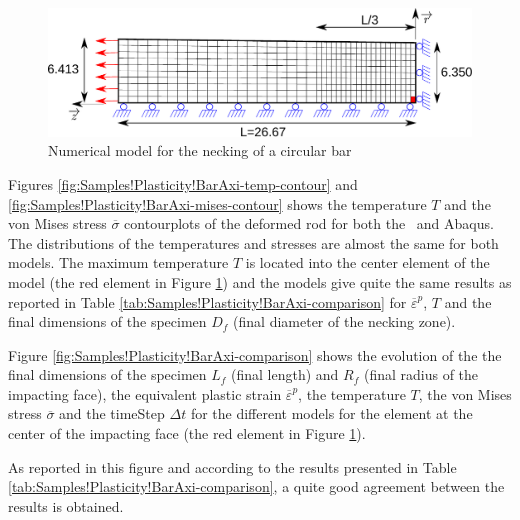 \begin{figure}[h]
\begin{centering}
\includegraphics[width=0.75\columnwidth]{Figures/BarNecking}
\par\end{centering}
\caption{Numerical model for the necking of a circular bar\label{fig:Samples!Plasticity!NeckingAxi}}
\end{figure}

Figures \ref{fig:Samples!Plasticity!BarAxi-temp-contour} and \ref{fig:Samples!Plasticity!BarAxi-mises-contour}
shows the temperature $T$ and the von Mises stress $\overline{\sigma}$
contourplots of the deformed rod for both the \DynELA~and Abaqus.
The distributions of the temperatures and stresses are almost the
same for both models. The maximum temperature $T$ is located into
the center element of the model (the red element in Figure \ref{fig:Samples!Plasticity!NeckingAxi})
and the models give quite the same results as reported in Table \ref{tab:Samples!Plasticity!BarAxi-comparison}
for $\overline{\varepsilon}^{p}$, $T$ and the final dimensions of
the specimen $D_{f}$ (final diameter of the necking zone). 

Figure \ref{fig:Samples!Plasticity!BarAxi-comparison} shows the evolution
of the the final dimensions of the specimen $L_{f}$ (final length)
and $R_{f}$ (final radius of the impacting face), the equivalent
plastic strain $\overline{\varepsilon}^{p}$, the temperature $T$,
the von Mises stress $\overline{\sigma}$ and the timeStep $\Delta t$
for the different models for the element at the center of the impacting
face (the red element in Figure \ref{fig:Samples!Plasticity!NeckingAxi}). 

As reported in this figure and according to the results presented
in Table \ref{tab:Samples!Plasticity!BarAxi-comparison}, a quite
good agreement between the results is obtained.

